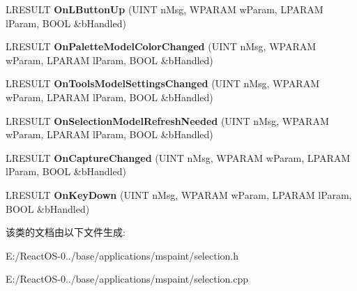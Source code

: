 \begin{DoxyCompactItemize}
\mbox{\label{class_c_selection_window_aeac8294081da7f0c2667fe5c1310d150}} 
L\+R\+E\+S\+U\+LT {\bfseries On\+L\+Button\+Up} (U\+I\+NT n\+Msg, W\+P\+A\+R\+AM w\+Param, L\+P\+A\+R\+AM l\+Param, B\+O\+OL \&b\+Handled)
\item 
\mbox{\label{class_c_selection_window_abcbfd5fd9467274792517389a45a05d3}} 
L\+R\+E\+S\+U\+LT {\bfseries On\+Palette\+Model\+Color\+Changed} (U\+I\+NT n\+Msg, W\+P\+A\+R\+AM w\+Param, L\+P\+A\+R\+AM l\+Param, B\+O\+OL \&b\+Handled)
\item 
\mbox{\label{class_c_selection_window_ae1afefd0c1236e09617103649ea52302}} 
L\+R\+E\+S\+U\+LT {\bfseries On\+Tools\+Model\+Settings\+Changed} (U\+I\+NT n\+Msg, W\+P\+A\+R\+AM w\+Param, L\+P\+A\+R\+AM l\+Param, B\+O\+OL \&b\+Handled)
\item 
\mbox{\label{class_c_selection_window_aeed134b4b79863548cc08f74de8b4f67}} 
L\+R\+E\+S\+U\+LT {\bfseries On\+Selection\+Model\+Refresh\+Needed} (U\+I\+NT n\+Msg, W\+P\+A\+R\+AM w\+Param, L\+P\+A\+R\+AM l\+Param, B\+O\+OL \&b\+Handled)
\item 
\mbox{\label{class_c_selection_window_ae3a52710a3e90cc68a47b6a871dcb9c4}} 
L\+R\+E\+S\+U\+LT {\bfseries On\+Capture\+Changed} (U\+I\+NT n\+Msg, W\+P\+A\+R\+AM w\+Param, L\+P\+A\+R\+AM l\+Param, B\+O\+OL \&b\+Handled)
\item 
\mbox{\label{class_c_selection_window_a59606f506987475a4ab3bfb571010bb6}} 
L\+R\+E\+S\+U\+LT {\bfseries On\+Key\+Down} (U\+I\+NT n\+Msg, W\+P\+A\+R\+AM w\+Param, L\+P\+A\+R\+AM l\+Param, B\+O\+OL \&b\+Handled)
\end{DoxyCompactItemize}


该类的文档由以下文件生成\+:\begin{DoxyCompactItemize}
\item 
E\+:/\+React\+O\+S-\/0../base/applications/mspaint/selection.\+h\item 
E\+:/\+React\+O\+S-\/0../base/applications/mspaint/selection.\+cpp\end{DoxyCompactItemize}
